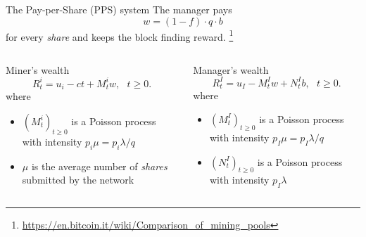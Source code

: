 \documentclass{beamer}
\makeatletter
\newcommand*{\iid}{\textbf{iid}\@\xspace}
\newcommand\blfootnote[1]{%
  \begingroup
  \renewcommand\thefootnote{}\footnote{#1}%
  \addtocounter{footnote}{-1}%
  \endgroup
}
\makeatother
\begin{document}
\begin{frame}{The Pay-per-Share (PPS) system}
\scriptsize
The manager pays
$$
w = (1-f)\cdot q \cdot b 
$$ 
for every \textit{share} and keeps the block finding reward.\blfootnote{\url{https://en.bitcoin.it/wiki/Comparison_of_mining_pools}}
\vspace{1cm}
\begin{columns}
\begin{column}{0.5\textwidth}
Miner's wealth
$$
R_t^i = u_i-ct + M_t^i w,\text{ }t\geq0.
$$
where 
\begin{itemize}
   \item $(M_t^i)_{t\geq0}$ is a Poisson process with intensity $p_i \mu= p_i\lambda / q$
   \item $\mu$ is the average number of \textit{shares} submitted by the network
\end{itemize}
\end{column}
\begin{column}{0.5\textwidth}
Manager's wealth
$$
R_t^I = u_I - M_t^I w+N_t^I b,\text{ }t\geq0.
$$
where 
\begin{itemize}
   \item $(M_t^I)_{t\geq0}$ is a Poisson process with intensity $p_I\mu =p_I\lambda / q$
   \item $(N_t^I)_{t\geq0}$ is a Poisson process with intensity $p_I\lambda$
\end{itemize}
\end{column}
\end{columns}
\end{frame}
\end{document}
